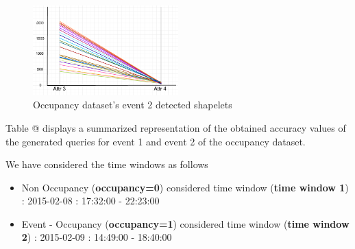 \documentclass[conference]{IEEEtran}  %
\makeatletter
\newcommand*{\rom}[1]{\expandafter\@slowromancap\romannumeral #1@}
\makeatother
\begin{document}
\begin{figure}[h!]
\includegraphics[width=0.5\textwidth]{Occupancy_event2.png}
\caption{Occupancy dataset's event 2 detected shapelets}
\end{figure}

Table \rom{1} displays a summarized representation of the obtained accuracy values of the generated queries for event 1 and event 2 of the occupancy dataset.

We have considered the time windows as follows
\begin{itemize}
\item Non Occupancy (\textbf{occupancy=0}) considered time window (\textbf{time window 1}) : 2015-02-08 : 17:32:00 - 22:23:00
\item Event - Occupancy (\textbf{occupancy=1}) considered time window (\textbf{time window 2}) : 2015-02-09 : 14:49:00 - 18:40:00
\end{itemize}
\end{document}
